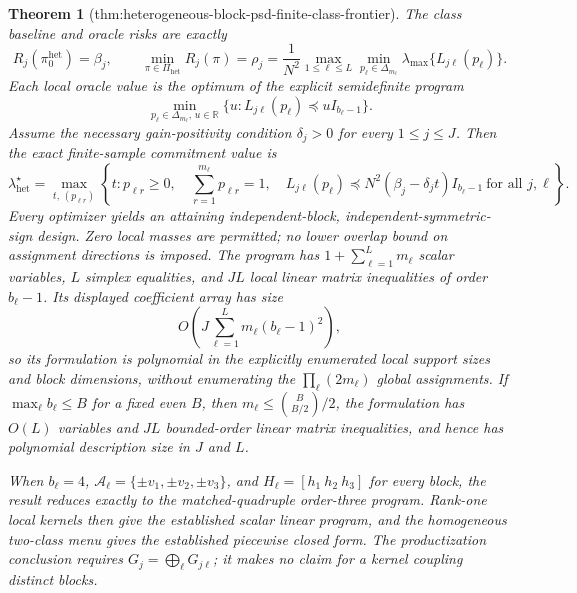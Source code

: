 \documentclass{article}
\newtheorem{theorem}{Theorem}
\begin{document}
\begin{theorem}[thm:heterogeneous-block-psd-finite-class-frontier]
The class baseline and oracle risks are exactly
\[
R_j(\pi_0^{\mathrm{het}})=\beta_j,
\qquad
\min_{\pi\in\Pi_{\mathrm{het}}}R_j(\pi)=\rho_j
=\frac1{N^2}\max_{1\le\ell\le L}
\min_{p_\ell\in\Delta_{m_\ell}}
\lambda_{\max}\{L_{j\ell}(p_\ell)\}.
\]
Each local oracle value is the optimum of the explicit semidefinite program
\[
\min_{p_\ell\in\Delta_{m_\ell},\,u\in\mathbb R}
\{u:L_{j\ell}(p_\ell)\preceq uI_{b_\ell-1}\}.
\]
Assume the necessary gain-positivity condition \(\delta_j>0\) for every \(1\le j\le J\).  Then the exact finite-sample commitment value is
\[
\boxed{
\lambda_{\mathrm{het}}^\star
=\max_{t,\,(p_{\ell r})}
\left\{t:
p_{\ell r}\ge0,\quad
\sum_{r=1}^{m_\ell}p_{\ell r}=1,\quad
L_{j\ell}(p_\ell)
\preceq N^2(\beta_j-\delta_jt)I_{b_\ell-1}
\ \text{for all }j,\ell
\right\}.}
\]
Every optimizer yields an attaining independent-block, independent-symmetric-sign design.  Zero local masses are permitted; no lower overlap bound on assignment directions is imposed.  The program has \(1+\sum_{\ell=1}^Lm_\ell\) scalar variables, \(L\) simplex equalities, and \(JL\) local linear matrix inequalities of order \(b_\ell-1\).  Its displayed coefficient array has size
\[
O\!\left(J\sum_{\ell=1}^Lm_\ell(b_\ell-1)^2\right),
\]
so its formulation is polynomial in the explicitly enumerated local support sizes and block dimensions, without enumerating the \(\prod_\ell(2m_\ell)\) global assignments.  If \(\max_\ell b_\ell\le B\) for a fixed even \(B\), then \(m_\ell\le\binom{B}{B/2}/2\), the formulation has \(O(L)\) variables and \(JL\) bounded-order linear matrix inequalities, and hence has polynomial description size in \(J\) and \(L\).

When \(b_\ell=4\), \(\mathcal A_\ell=\{\pm v_1,\pm v_2,\pm v_3\}\), and \(H_\ell=[h_1\ h_2\ h_3]\) for every block, the result reduces exactly to the matched-quadruple order-three program.  Rank-one local kernels then give the established scalar linear program, and the homogeneous two-class menu gives the established piecewise closed form.  The productization conclusion requires \(G_j=\bigoplus_\ell G_{j\ell}\); it makes no claim for a kernel coupling distinct blocks.
\end{theorem}
\end{document}
